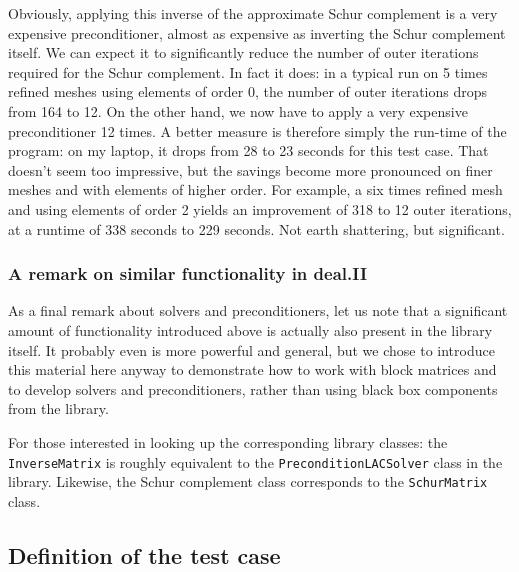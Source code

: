 \documentclass{article}
\begin{document}
Obviously, applying this inverse of the approximate Schur complement is a very
expensive preconditioner, almost as expensive as inverting the Schur
complement itself. We can expect it to significantly reduce the number of
outer iterations required for the Schur complement. In fact it does: in a
typical run on 5 times refined meshes using elements of order 0, the number of
outer iterations drops from 164 to 12. On the other hand, we now have to apply
a very expensive preconditioner 12 times. A better measure is therefore simply
the run-time of the program: on my laptop, it drops from 28 to 23 seconds for
this test case. That doesn't seem too impressive, but the savings become more
pronounced on finer meshes and with elements of higher order. For example, a
six times refined mesh and using elements of order 2 yields an improvement of
318 to 12 outer iterations, at a runtime of 338 seconds to 229 seconds. Not
earth shattering, but significant.


\subsubsection*{A remark on similar functionality in deal.II}

As a final remark about solvers and preconditioners, let us note that a
significant amount of functionality introduced above is actually also present
in the library itself. It probably even is more powerful and general, but we
chose to introduce this material here anyway to demonstrate how to work with
block matrices and to develop solvers and preconditioners, rather than using
black box components from the library.

For those interested in looking up the corresponding library classes: the
\texttt{InverseMatrix} is roughly equivalent to the
\texttt{PreconditionLACSolver} class in the library. Likewise, the Schur
complement class corresponds to the \texttt{SchurMatrix} class.


\subsection*{Definition of the test case}
\end{document}
